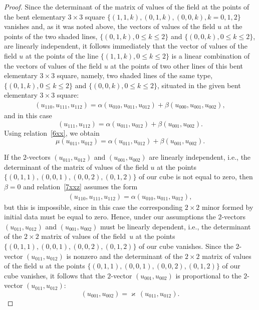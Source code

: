 \documentclass[11pt]{article}
\begin{document}
\begin{proof}
Since the determinant of the matrix of values of the f\/ield at the
points of the bent elementary $3 \times 3$ square $\{(1, 1, k), (0,
1, k), (0, 0, k), k = 0, 1, 2\}$ vanishes and, as it was noted
above, the vectors of values of the f\/ield $u$ at the points of the
two shaded lines, $\{(0, 1, k), 0 \leq k \leq 2\}$ and $\{(0, 0, k),
0 \leq k \leq 2\}$, are linearly independent, it follows immediately
that the vector of values of the f\/ield $u$ at the points of the line
$\{(1, 1, k), 0 \leq k \leq 2\}$ is a linear combination of the
vectors of values of the f\/ield $u$ at the points of two other lines
of this bent elementary $3 \times 3$ square, namely, two shaded
lines of the same type, $\{(0, 1, k), 0 \leq k \leq 2\}$ and $\{(0,
0, k), 0 \leq k \leq 2\}$, situated in the given bent elementary $3
\times 3$ square:
\begin{gather} (u_{1 1 0}, u_{1 1 1}, u_{1 1 2}) = \alpha (u_{0 1 0}, u_{0 1
1}, u_{0 1 2}) + \beta (u_{0 0 0}, u_{0 0 1}, u_{0 0 2}),
\label{7xxz}
\end{gather} and in this case \[ (u_{1 1 1}, u_{1 1 2}) =
\alpha (u_{0 1 1}, u_{0 1 2}) + \beta (u_{0 0 1}, u_{0 0 2}). \]
Using relation~\eqref{6xx}, we obtain \[ \mu (u_{0 1 1}, u_{0 1 2})
= \alpha (u_{0 1 1}, u_{0 1 2}) + \beta (u_{0 0 1}, u_{0 0 2}). \]


If the $2$-vectors $(u_{0 1 1}, u_{0 1 2})$ and $(u_{0 0 1}, u_{0 0
2})$ are linearly independent, i.e., the determinant of the matrix
of values of the f\/ield $u$ at the points $\{(0, 1, 1), (0, 0, 1),
(0, 0, 2), (0, 1, 2)\}$ of our cube is not equal to zero, then
$\beta = 0$ and relation~\eqref{7xxz} assumes the form
\begin{gather*} (u_{1 1
0}, u_{1 1 1}, u_{1 1 2}) = \alpha (u_{0 1 0}, u_{0 1 1}, u_{0 1
2}), %
\end{gather*} but this is impossible, since in this case the
corresponding $2 \times 2$ minor formed by initial data must be
equal to zero.
Hence, under our assumptions the $2$-vectors $(u_{0 1 1}, u_{0 1
2})$ and $(u_{0 0 1}, u_{0 0 2})$ must be linearly dependent, i.e.,
the determinant of the $2 \times 2$ matrix of values of the f\/ield~$u$ at the points $\{(0, 1, 1), (0, 0, 1), (0, 0, 2), (0, 1, 2)\}$
of our cube vanishes. Since the $2$-vector $(u_{0 1 1}, u_{0 1 2})$
is nonzero and the determinant of the $2 \times 2$ matrix of values
of the f\/ield $u$ at the points $\{(0, 1, 1), (0, 0, 1), (0, 0, 2),
(0, 1, 2)\}$ of our cube vanishes, it follows that the $2$-vector
$(u_{0 0 1}, u_{0 0 2})$ is proportional to the $2$-vector $(u_{0 1
1}, u_{0 1 2})$: \[ (u_{0 0 1}, u_{0 0 2}) = \varkappa \, (u_{0 1
1}, u_{0 1 2}). \]



\end{proof}
\end{document}
